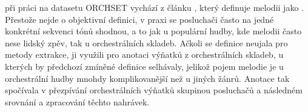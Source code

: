 \cite{Bosch2016} při práci na datasetu ORCHSET vychází z článku \cite{Poliner2007}, který definuje melodii jako . Přestože nejde o objektivní definici, v praxi se posluchači často na jedné konkrétní sekvenci tónů shodnou, a to jak u populární hudby, kde melodii často nese lidský zpěv, tak u orchestrálních skladeb. Ačkoli se definice neujala pro metody extrakce, \cite{Bosch2016} ji využili pro anotaci výňatků z orchestrálních skladeb, u kterých by předchozí zmíněné definice selhávaly, jelikož pojem melodie je u orchestrální hudby mnohdy komplikovanější než u jiných žánrů. Anotace tak spočívala v přezpívání orchestrálních výňatků skupinou posluchačů a následném srovnání a zpracování těchto nahrávek.
